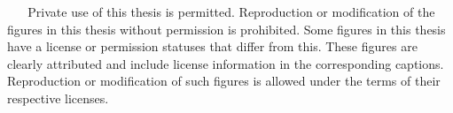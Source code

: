 {%
\copyrighttext%
  {\copyrightstring\ \allrightsreservedeng}%
  {%
    \copyrightstring\ \allrightsreservedeng
    \blockpar
    Private use of this thesis is permitted. Reproduction or modification of the figures in this thesis without permission is prohibited.
    \blockpar
    Some figures in this thesis have a license or permission statuses that differ from this. These figures are clearly attributed and include license information in the corresponding captions. Reproduction or modification
    of such figures is allowed under the terms of their respective licenses.
}
}
